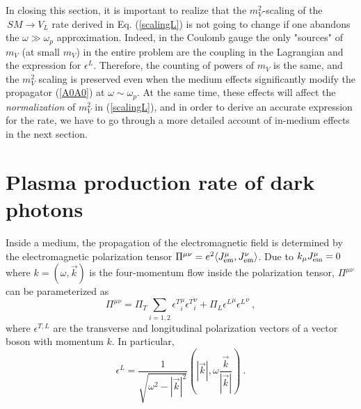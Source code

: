 \documentclass[12pt]{article}
\begin{document}
In closing this section, it is  important to realize that the $m_V^2$-scaling of the ${\,SM\to V_L}$ rate
derived in Eq. (\ref{scalingL}) is not going to change if one abandons the
$\omega \gg \omega_p$ approximation. Indeed, in the Coulomb gauge the only "sources" of 
$m_V$ (at small $m_V$) in the entire problem are the coupling in the Lagrangian and the 
expression for $\epsilon^L$. Therefore, the counting of powers of $m_V$ is the same, 
and the $m_V^2$ scaling is  preserved even when 
the  medium effects significantly modify the propagator (\ref{A0A0}) at $\omega \sim \omega_p$. 
At the same time, 
these effects will affect the {\em normalization } of $m_V^2$ in (\ref{scalingL}), and in order to derive 
an accurate expression for the rate, we have to go through a more detailed account of 
in-medium effects in the next section. 


\section{Plasma production rate of dark photons}
\label{sec:3}

Inside a medium, the propagation of the electromagnetic field is
determined by the electromagnetic polarization tensor $\Pi^{\mu\nu} =
e^2 \langle J_{\rm em}^\mu ,J_{\rm em}^\nu\rangle$. Due to $k_\mu
J_{\rm em}^\mu = 0$ where $k=(\omega,\vec k)$ is the four-momentum
flow inside the polarization tensor, $\Pi^{\mu\nu}$ can be
parameterized as
\begin{equation}
\Pi^{\mu\nu} = \Pi_T \sum_{i=1,2} {\epsilon^{T}}^{\mu}_i {\epsilon^T}^\nu_i + \Pi_L {\epsilon^{L}}^\mu {\epsilon^L}^\nu \ ,
\end{equation}
where $\epsilon^{T,L}$ are the transverse and longitudinal
polarization vectors of a vector boson with momentum $k$. In
particular,
\begin{equation}\label{epsilonL}
\epsilon^L = \frac{1}{\sqrt{\omega^2 - |\vec k|^2}} (|\vec k|,\omega \frac{\vec k}{|\vec k|}) \ .
\end{equation}
\end{document}
